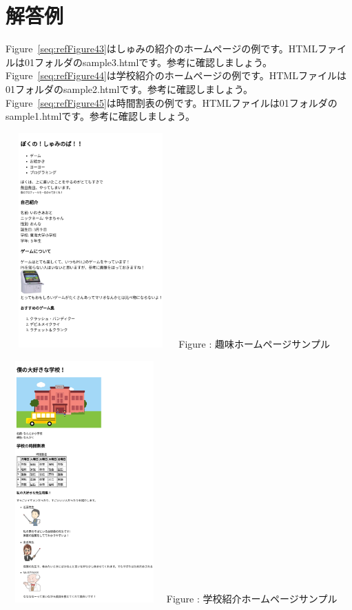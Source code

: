 \documentclass[a4paper,12pt]{jarticle}
\begin{document}
\section{解答例}
 {Figure~\ref{seq:refFigure43}はしゅみの紹介のホームページの例です。HTMLファイルは01フォルダのsample3.htmlです。参考に確認しましょう。}\\
{Figure~\ref{seq:refFigure44}は学校紹介のホームページの例です。HTMLファイルは01フォルダのsample2.htmlです。参考に確認しましょう。}\\
{Figure~\ref{seq:refFigure45}は時間割表の例です。HTMLファイルは01フォルダのsample1.htmlです。参考に確認しましょう。}\\

\centering
\begin{minipage}{7.518cm}
  {\upshape
    \includegraphics[width=6.525cm,height=8.262cm]{textbook-img209.png}
    \newline
    Figure {\theFigure\label{seq:refFigure43}}:
    趣味ホームページサンプル}
\end{minipage}
\begin{minipage}{7.703cm}
  {\upshape
    \includegraphics[width=6.062cm,height=9.306cm]{textbook-img210.png}
    \newline
    Figure {\theFigure\label{seq:refFigure44}}:
    学校紹介ホームページサンプル}
\end{minipage}
\end{document}
